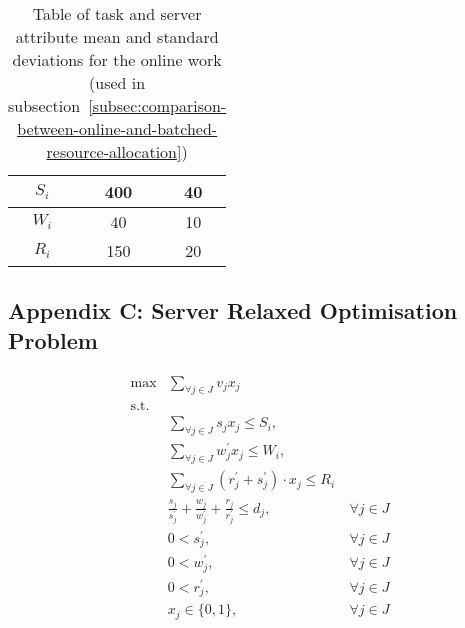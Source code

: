 \begin{table}[h]
\begin{minipage}{2.8in}
\begin{tabular}{|c|c|c|}
            $S_i$          & 400  & 40                 \\ \hline
            $W_i$          & 40   & 10                 \\ \hline
            $R_i$          & 150  & 20                 \\ \hline
        \end{tabular}
        \caption{Table of task and server attribute mean and standard deviations for the online work
        (used in subsection~\ref{subsec:comparison-between-online-and-batched-resource-allocation})}
    \end{minipage}
    \label{tab:synthetic-models}
\end{table}

\subsection*{Appendix C: Server Relaxed Optimisation Problem}
\begin{align}
    \max & \sum_{\forall j \in J} v_j x_j \label{eq:relaxed-objective} \\
    \mbox{s.t.} \nonumber \\
    & \sum_{\forall j \in J} s_j x_j \leq S_i, \label{eq:relaxed-server-storage-constraint} \\
    & \sum_{\forall j \in J} w^{'}_j x_j \leq W_i,  \label{eq:relaxed-server-computation-constraint} \\
    & \sum_{\forall j \in J} (r^{'}_j + s^{'}_j) \cdot x_j \leq R_i \label{eq:relaxed-server-bandwidth-constraint} \\
    & \frac{s_j}{s^{'}_j} + \frac{w_j}{w^{'}_j} + \frac{r_j}{r^{'}_j} \leq d_j, &~ \forall{j \in J} \label{eq:relaxed-task-deadline} \\
    & 0 < s^{'}_j, &~ \forall{j \in J} \label{eq:relaxed-loading-speeds} \\
    & 0 < w^{'}_j, &~ \forall{j \in J} \label{eq:relaxed-compute-speeds} \\
    & 0 < r^{'}_j, &~ \forall{j \in J} \label{eq:relaxed-sending-speeds} \\
    & x_j \in \{0, 1\}, &~ \forall{j \in J} \label{eq:relaxed-task-allocation}
\end{align}